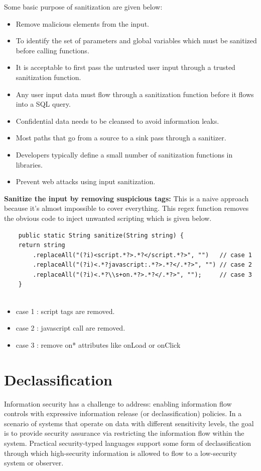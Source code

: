 Some basic purpose of sanitization are given below:
\begin{itemize}
	\item Remove malicious elements from the input.
	\item To identify the set of parameters and global variables which must be sanitized before calling functions.
	\item It is acceptable to first pass the untrusted user input through a trusted sanitization function.	
	\item Any user input data must flow through a sanitization function before it flows into a SQL query.
	\item Confidential data needs to be cleansed to avoid information leaks.
	\item Most paths that go from a source to a sink pass through a sanitizer.
	\item Developers typically define a small number of sanitization functions in libraries.
	\item Prevent web attacks using input sanitization.
\end{itemize}

\textbf{Sanitize the input by removing suspicious tags:}
This is a naive approach because it's almost impossible to cover everything. This regex function removes the obvious code to inject unwanted scripting which is given below.

\begin{lstlisting}
	public static String sanitize(String string) {
	return string
		.replaceAll("(?i)<script.*?>.*?</script.*?>", "")   // case 1
		.replaceAll("(?i)<.*?javascript:.*?>.*?</.*?>", "") // case 2
		.replaceAll("(?i)<.*?\\s+on.*?>.*?</.*?>", "");     // case 3
	}
	
\end{lstlisting}

\begin{itemize}
	\item case 1 : script tags are removed.
	\item case 2 : javascript call are removed.
	\item case 3 : remove on* attributes like onLoad or onClick
\end{itemize}

\section{Declassification}
Information security has a challenge to address: enabling information flow controls with expressive information release (or declassification) policies. In a scenario of systems that operate on data with different sensitivity levels, the goal is to provide security assurance via restricting the information flow within the system. Practical security-typed languages support some form of declassification through which high-security information is allowed to flow to a low-security system or observer.

